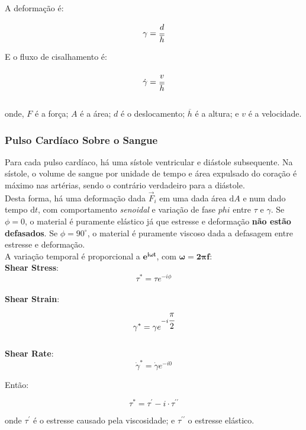 \documentclass[a4paper,12pt]{article}
\begin{document}
A deformação é:

\begin{equation*}
    \gamma = \cfrac{d}{\overline h}
\end{equation*}

E o fluxo de cisalhamento é:

\begin{equation*}
    \dot \gamma = \cfrac{v}{\overline h}
\end{equation*} \\

onde, $F$ é a força; $A$ é a área; $d$ é o deslocamento; $\overline h$ é a altura; e $v$ é a velocidade.

\subsubsection*{Pulso Cardíaco Sobre o Sangue}

Para cada pulso cardíaco, há uma sístole ventricular e diástole subsequente. Na sístole, o volume de sangue por unidade de tempo e área expulsado do coração é máximo nas artérias, sendo o contrário verdadeiro para a diástole. \\ 

Desta forma, há uma deformação dada $\vec{F}_i$ em uma dada área $\text{d}A$ e num dado tempo $\text{d}t$, com comportamento \emph{senoidal} e variação de fase $phi$ entre $\tau$ e $\gamma$. Se $\phi=0$, o material é puramente elástico já que estresse e deformação \textbf{não estão defasados}. Se $\phi=90 ^\circ$, o material é puramente viscoso dada a defasagem entre estresse e deformação. \\

A variação temporal é proporcional a {$\mathbf{e^{i \omega t}}$, com $\mathbf{\omega = 2 \pi f}$}: \\[8pt]

\textbf{Shear Stress}:\\

\begin{equation*}
    \tau^{*} = \tau e^{-i \phi}
\end{equation*} \\

\textbf{Shear Strain}:\\

\begin{equation*}
    \gamma^{*} = \gamma e ^{-i \cfrac{\pi}{2}}
\end{equation*} \\

\textbf{Shear Rate}: \\

\begin{equation*}
    \dot \gamma^{*} = \dot \gamma e^{-i 0}
\end{equation*}

Então:

\begin{equation*}
    \tau^{*} = \tau ^ \prime - i \cdot \tau ^ {\prime \prime}
\end{equation*}

onde $\tau ^\prime$ é o estresse causado pela viscosidade; e $\tau ^{\prime \prime}$ o estresse elástico.
\end{document}
